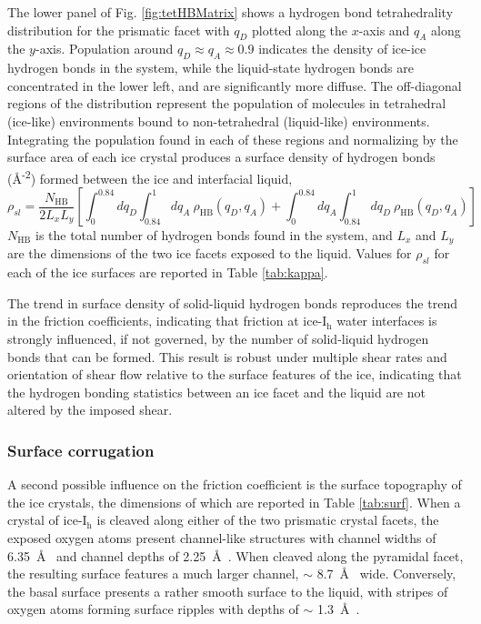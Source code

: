 The lower panel of Fig. \ref{fig:tetHBMatrix} shows a hydrogen bond
tetrahedrality distribution for the prismatic facet with $q_{D}$
plotted along the $x$-axis and $q_{A}$ along the $y$-axis.  Population
around $q_{D} \approx q_{A} \approx 0.9$ indicates the density of
ice-ice hydrogen bonds in the system, while the liquid-state hydrogen
bonds are concentrated in the lower left, and are significantly more
diffuse.  The off-diagonal regions of the distribution represent the
population of molecules in tetrahedral (ice-like) environments bound
to non-tetrahedral (liquid-like) environments. Integrating the
population found in each of these regions and normalizing by the
surface area of each ice crystal produces a surface density of
hydrogen bonds (\AA\textsuperscript{-2}) formed between the ice and
interfacial liquid,
\begin{equation}\label{hbondDensity}
\rho_{sl} = \frac{N_\mathrm{HB}}{2 L_{x}L_{y}} \left[ \int_0^{0.84}
  dq_{D} \int_{0.84}^1 dq_{A}~\rho_\mathrm{HB}(q_{D},q_{A}) +  \int_0^{0.84}
  dq_{A} \int_{0.84}^1 dq_{D}~\rho_\mathrm{HB}(q_{D},q_{A}) \right]
\end{equation}
$N_\mathrm{HB}$ is the total number of hydrogen bonds found in the
system, and $L_x$ and $L_y$ are the dimensions of the two ice facets
exposed to the liquid.  Values for $\rho_{sl}$ for each of the ice
surfaces are reported in Table \ref{tab:kappa}.

The trend in surface density of solid-liquid hydrogen bonds reproduces
the trend in the friction coefficients, indicating that friction at
ice-I$_\mathrm{h}$ water interfaces is strongly influenced, if not
governed, by the number of solid-liquid hydrogen bonds that can be
formed.  This result is robust under multiple shear rates and
orientation of shear flow relative to the surface features of the ice,
indicating that the hydrogen bonding statistics between an ice facet
and the liquid are not altered by the imposed shear.

\subsubsection{Surface corrugation}
A second possible influence on the friction coefficient is the surface
topography of the ice crystals, the dimensions of which are reported
in Table \ref{tab:surf}. When a crystal of ice-I$_\mathrm{h}$ is
cleaved along either of the two prismatic crystal facets, the exposed
oxygen atoms present channel-like structures with channel widths of
6.35~\AA~ and channel depths of 2.25~\AA~.  When cleaved along the
pyramidal facet, the resulting surface features a much larger channel,
$\sim$ 8.7~\AA~ wide.  Conversely, the basal surface presents a
rather smooth surface to the liquid, with stripes of oxygen atoms
forming surface ripples with depths of $\sim$ 1.3~\AA~.

